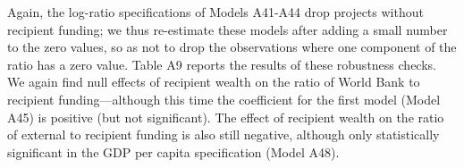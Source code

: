 \documentclass{article}
\begin{document}
Again, the log-ratio specifications of Models A41-A44 drop projects without recipient funding; we thus re-estimate these models after adding a small number to the zero values, so as not to drop the observations where one component of the ratio has a zero value. Table A9 reports the results of these robustness checks. We again find null effects of recipient wealth on the ratio of World Bank to recipient funding---although this time the coefficient for the first model (Model A45) is positive (but not significant). The effect of recipient wealth on the ratio of external to recipient funding is also still negative, although only statistically significant in the GDP per capita specification (Model A48). 			

\begin{singlespace}
	\begin{table}[H]
		\centering
		\caption{Effect of Recipient Wealth on Adjusted Log-Ratio Bargaining Outcomes for World Bank Projects}
		\label{tab:TA9}
\end{table}
\end{singlespace}
\end{document}

